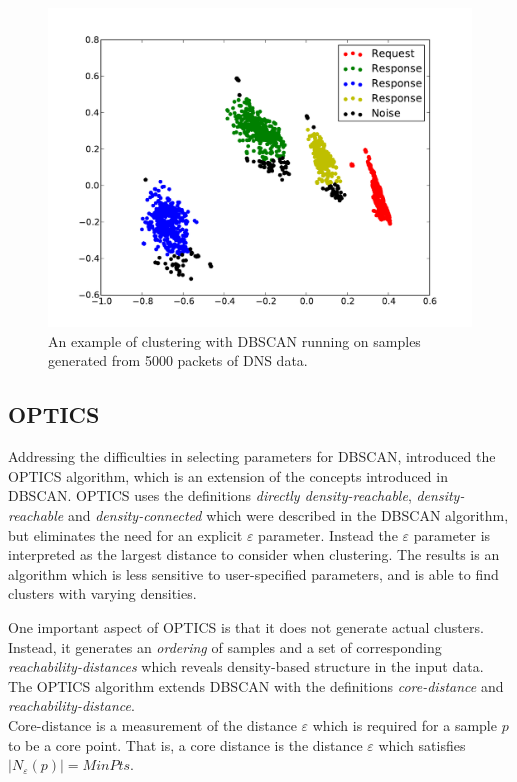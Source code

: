 \documentclass[a4paper]{report}
\begin{document}
\begin{figure}[h]
    \includegraphics[width=\linewidth]{dbscan_dns}
    \caption{An example of clustering with DBSCAN running on samples generated
    from 5000 packets of DNS data.}
    \label{fig:dbscan}
\end{figure}

\subsection{OPTICS}
Addressing the difficulties in selecting parameters for DBSCAN,
\citet{ankerst99} introduced the OPTICS algorithm, which is an extension of
the concepts introduced in DBSCAN. OPTICS uses the definitions
\emph{directly density-reachable}, \emph{density-reachable} and
\emph{density-connected} which were described in the DBSCAN algorithm, but
eliminates the need for an explicit $\varepsilon$ parameter. Instead the
$\varepsilon$ parameter is interpreted as the largest distance to consider
when clustering. The results is an algorithm which is less sensitive to
user-specified parameters, and is able to find clusters with varying densities.

One important aspect of OPTICS is that it does not generate actual clusters.
Instead, it generates an \emph{ordering} of samples and a set of corresponding
\emph{reachability-distances} which reveals density-based structure in the
input data. The OPTICS algorithm extends DBSCAN with the definitions
\emph{core-distance} and \emph{reachability-distance}.
\\[0.5cm]
Core-distance is a measurement of the distance $\varepsilon$ which is required
for a sample $p$ to be a core point. That is, a core distance is the distance
$\varepsilon$ which satisfies $|N_{\varepsilon}(p)| = MinPts$.
\end{document}
